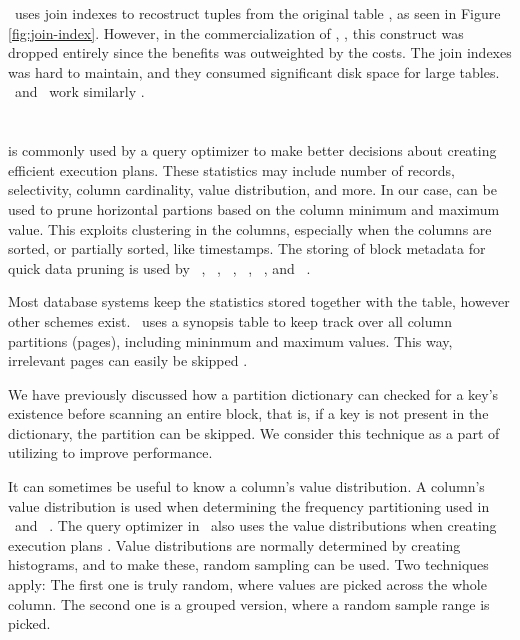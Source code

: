 \cstore~uses join indexes to recostruct tuples from the original table \cite{Lamb2012-kg}, as seen in Figure \ref{fig:join-index}. However, in the commercialization of \cstore, \vertica, this construct was dropped entirely since the benefits was outweighted by the costs. The join indexes was hard to maintain, and they consumed significant disk space for large tables. \monetdb~and \monetx~work similarly \cite{Boncz2002-yj, Boncz2005-wj}.


\section{}
\label{sec:Database Statistics}
 is commonly used by a query optimizer to make better decisions about creating efficient execution plans. These statistics may include number of records, selectivity, column cardinality, value distribution, and more. In our case,  can be used to prune horizontal partions based on the column minimum and maximum value. This exploits clustering in the columns, especially when the columns are sorted, or partially sorted, like timestamps. The storing of block metadata for quick data pruning is used by \oracle~\cite{Lahiri2015-mz}, \ibm~\cite{Roman2013-em}, \vertica~\cite{Lamb2012-kg}, \monetx~\cite{Boncz2005-wj}, \mssql~\cite{Larson2013-mc}, and \exasol~\cite{Exasol2014-xh}.

Most database systems keep the statistics stored together with the table, however other schemes exist. \ibm~uses a synopsis table to keep track over all column partitions (pages), including mininmum and maximum values. This way, irrelevant pages can easily be skipped \cite{Raman2013-em}.

We have previously discussed how a partition dictionary can checked for a key's existence before scanning an entire block, that is, if a key is not present in the dictionary, the partition can be skipped. We consider this technique as a part of utilizing  to improve performance.

It can sometimes be useful to know a column's value distribution. A column's value distribution is used when determining the frequency partitioning used in \blink~and \ibm~\cite{Raman2008-gi, Raman2013-em}. The query optimizer in \mssql~also uses the value distributions when creating execution plans \cite{Larson2013-mc}. Value distributions are normally determined by creating histograms, and to make these, random sampling can be used. Two techniques apply: The first one is truly random, where values are picked across the whole column. The second one is a grouped version, where a random sample range is picked.

